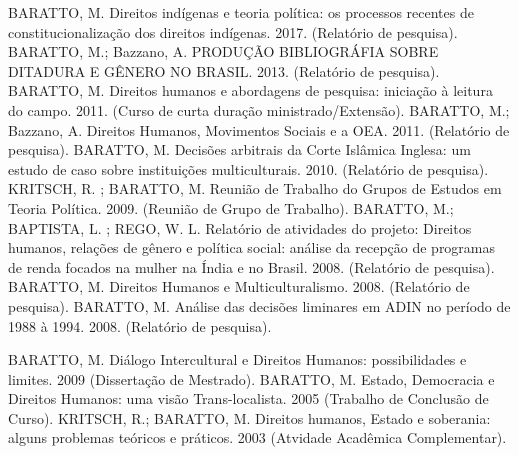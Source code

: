 
\begin{cvcitems}
  \cvcitem
    {BARATTO, M.}
    {Direitos indígenas e teoria política: os processos recentes de constitucionalização dos direitos indígenas. 2017. (Relatório de pesquisa).}
  \cvcitem
    {BARATTO, M.; Bazzano, A.}
    {PRODUÇÃO BIBLIOGRÁFIA SOBRE DITADURA E GÊNERO NO BRASIL. 2013. (Relatório de pesquisa).}
  \cvcitem
    {BARATTO, M.}
    {Direitos humanos e abordagens de pesquisa: iniciação à leitura do campo. 2011. (Curso de curta duração ministrado/Extensão).}
  \cvcitem
    {BARATTO, M.; Bazzano, A.}
    {Direitos Humanos, Movimentos Sociais e a OEA. 2011. (Relatório de pesquisa).}
  \cvcitem
    {BARATTO, M.}
    {Decisões arbitrais da Corte Islâmica Inglesa: um estudo de caso sobre instituições multiculturais. 2010. (Relatório de pesquisa).}
  \cvcitem
    {KRITSCH, R. ; BARATTO, M.}
    {Reunião de Trabalho do Grupos de Estudos em Teoria Política. 2009. (Reunião de Grupo de Trabalho).}
  \cvcitem
    {BARATTO, M.; BAPTISTA, L. ; REGO, W. L.}
    {Relatório de atividades do projeto: Direitos humanos, relações de gênero e política social: análise da recepção de programas de renda focados na mulher na Índia e no Brasil. 2008. (Relatório de pesquisa).}
  \cvcitem
    {BARATTO, M.}
    {Direitos Humanos e Multiculturalismo. 2008. (Relatório de pesquisa).}
  \cvcitem
    {BARATTO, M.}
    {Análise das decisões liminares em ADIN no período de 1988 à 1994. 2008. (Relatório de pesquisa).}
\end{cvcitems}


\begin{cvcitems}
  \cvcitem
    {BARATTO, M.}
    {Diálogo Intercultural e Direitos Humanos: possibilidades e limites. 2009 (Dissertação de Mestrado).}
  \cvcitem
    {BARATTO, M.}
    {Estado, Democracia e Direitos Humanos: uma visão Trans-localista. 2005 (Trabalho de Conclusão de Curso).}
  \cvcitem
    {KRITSCH, R.; BARATTO, M.}
    {Direitos humanos, Estado e soberania: alguns problemas teóricos e práticos. 2003
    (Atvidade Acadêmica Complementar).}
\end{cvcitems}
\pagebreak

